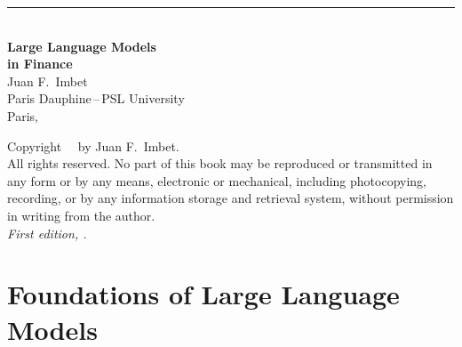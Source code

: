 \documentclass[12pt, openany, twoside]{book}
\begin{document}
% 

\begin{titlepage}
  \thispagestyle{empty}
  \vspace*{3cm}
  \begin{center}
    {\rule{0.6\textwidth}{0.5pt}}\\[1.5cm]
    {\Large\bfseries Large Language Models\\[6pt] in Finance}\\[1.8cm]
    {\large Juan F.\ Imbet}\\[0.4cm]
    {\small Paris Dauphine\,--\,PSL University}\\[2.1cm]
    {\small Paris, \the\year}
  \end{center}
  \vfill
\end{titlepage}

\newpage
\thispagestyle{empty}
\vspace*{\fill}
{\small
\noindent Copyright \textcopyright\ \the\year\ by Juan F.\ Imbet.\\[6pt]
All rights reserved. No part of this book may be reproduced or transmitted
in any form or by any means, electronic or mechanical, including photocopying,
recording, or by any information storage and retrieval system, without
permission in writing from the author.\\[12pt]
\noindent\textit{First edition, \the\year.}
}

\frontmatter
\tableofcontents



\mainmatter


\part{Foundations of Large Language Models}





\end{document}
